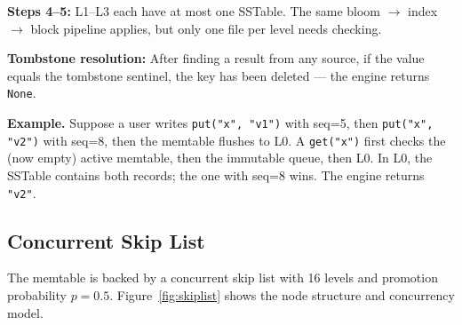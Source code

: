 \documentclass[conference]{IEEEtran}
\begin{document}
\textbf{Steps 4--5:} L1--L3 each have at most one SSTable. The same bloom $\rightarrow$ index $\rightarrow$ block pipeline applies, but only one file per level needs checking.

\textbf{Tombstone resolution:} After finding a result from any source, if the value equals the tombstone sentinel, the key has been deleted --- the engine returns \texttt{None}.

\textbf{Example.} Suppose a user writes \texttt{put("x", "v1")} with seq=5, then \texttt{put("x", "v2")} with seq=8, then the memtable flushes to L0. A \texttt{get("x")} first checks the (now empty) active memtable, then the immutable queue, then L0. In L0, the SSTable contains both records; the one with seq=8 wins. The engine returns \texttt{"v2"}.

\subsection{Concurrent Skip List}
\label{sec:skiplist}

The memtable is backed by a concurrent skip list with 16 levels and promotion probability $p = 0.5$. Figure~\ref{fig:skiplist} shows the node structure and concurrency model.
\end{document}

